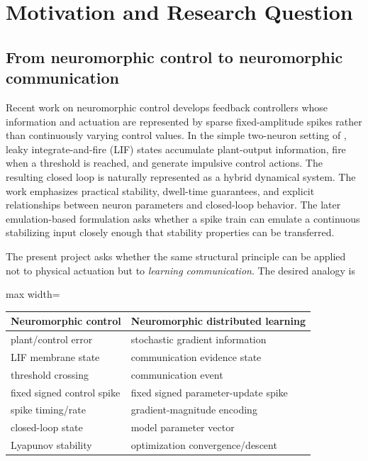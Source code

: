 \section{Motivation and Research Question}

\subsection{From neuromorphic control to neuromorphic communication}

Recent work on neuromorphic control develops feedback controllers whose information and actuation are represented by sparse fixed-amplitude spikes rather than continuously varying control values. In the simple two-neuron setting of \citet{petri2024simple}, leaky integrate-and-fire (LIF) states accumulate plant-output information, fire when a threshold is reached, and generate impulsive control actions. The resulting closed loop is naturally represented as a hybrid dynamical system. The work emphasizes practical stability, dwell-time guarantees, and explicit relationships between neuron parameters and closed-loop behavior. The later emulation-based formulation \citep{petri2025emulation} asks whether a spike train can emulate a continuous stabilizing input closely enough that stability properties can be transferred.

The present project asks whether the same structural principle can be applied not to physical actuation but to \emph{learning communication}. The desired analogy is
\begin{center}
\begin{adjustbox}{max width=\textwidth}
\begin{tabular}{ll}
\toprule
Neuromorphic control & Neuromorphic distributed learning \\
\midrule
plant/control error & stochastic gradient information \\
LIF membrane state & communication evidence state \\
threshold crossing & communication event \\
fixed signed control spike & fixed signed parameter-update spike \\
spike timing/rate & gradient-magnitude encoding \\
closed-loop state & model parameter vector \\
Lyapunov stability & optimization convergence/descent \\
\bottomrule
\end{tabular}
\end{adjustbox}
\end{center}

